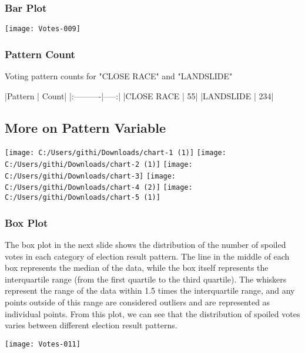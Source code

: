 \documentclass[fleqn,a4paper,12pt]{article}
\begin{document}
\subsubsection{Bar Plot}

\texttt{[image: Votes-009]}

\subsubsection{Pattern Count}

Voting pattern counts for "CLOSE RACE" and "LANDSLIDE" 
\begin{Schunk}
\begin{Soutput}
|Pattern    | Count|
|:----------|-----:|
|CLOSE RACE |    55|
|LANDSLIDE  |   234|
\end{Soutput}
\end{Schunk}

\subsection{More on Pattern Variable}


  \begin{center}
  \texttt{[image: C:/Users/githi/Downloads/chart-1 (1)]}
  \texttt{[image: C:/Users/githi/Downloads/chart-2 (1)]}
  \texttt{[image: C:/Users/githi/Downloads/chart-3]}
  \texttt{[image: C:/Users/githi/Downloads/chart-4 (2)]}
  \texttt{[image: C:/Users/githi/Downloads/chart-5 (1)]}
\end{center}

\subsubsection{Box Plot}

 
The box plot in the next slide shows the distribution of the number of spoiled votes in each category of election result pattern. The line in the middle of each box represents the median of the data, while the box itself represents the interquartile range (from the first quartile to the third quartile). The whiskers represent the range of the data within 1.5 times the interquartile range, and any points outside of this range are considered outliers and are represented as individual points.
From this plot, we can see that the distribution of spoiled votes varies between different election result patterns.
 

\texttt{[image: Votes-011]}
\end{document}
